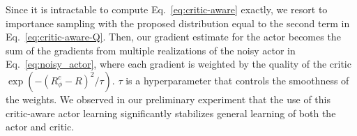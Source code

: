 Since it is intractable to compute Eq.~\eqref{eq:critic-aware} exactly, we resort to importance sampling with the proposed distribution equal to the second term in Eq.~\eqref{eq:critic-aware-Q}. Then, our gradient estimate for the actor becomes the sum of the gradients from multiple realizations of the noisy actor in Eq.~\eqref{eq:noisy_actor}, where each gradient is weighted by the quality of the critic $\exp(-(R^c_{\phi} - R)^2 /\tau)$. $\tau$ is a hyperparameter that controls the smoothness of the weights. We observed in our preliminary experiment that the use of this critic-aware actor learning significantly stabilizes general learning of both the actor and critic.








